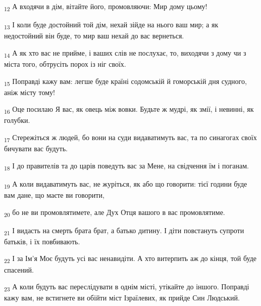 \begin{tcolorbox}
\textsubscript{12} А входячи в дім, вітайте його, промовляючи: Мир дому цьому!
\end{tcolorbox}
\begin{tcolorbox}
\textsubscript{13} І коли буде достойний той дім, нехай зійде на нього ваш мир; а як недостойний він буде, то мир ваш нехай до вас вернеться.
\end{tcolorbox}
\begin{tcolorbox}
\textsubscript{14} А як хто вас не прийме, і ваших слів не послухає, то, виходячи з дому чи з міста того, обтрусіть порох із ніг своїх.
\end{tcolorbox}
\begin{tcolorbox}
\textsubscript{15} Поправді кажу вам: легше буде країні содомській й гоморській дня судного, аніж місту тому!
\end{tcolorbox}
\begin{tcolorbox}
\textsubscript{16} Оце посилаю Я вас, як овець між вовки. Будьте ж мудрі, як змії, і невинні, як голубки.
\end{tcolorbox}
\begin{tcolorbox}
\textsubscript{17} Стережіться ж людей, бо вони на суди видаватимуть вас, та по синагогах своїх бичувати вас будуть.
\end{tcolorbox}
\begin{tcolorbox}
\textsubscript{18} І до правителів та до царів поведуть вас за Мене, на свідчення їм і поганам.
\end{tcolorbox}
\begin{tcolorbox}
\textsubscript{19} А коли видаватимуть вас, не журіться, як або що говорити: тієї години буде вам дане, що маєте ви говорити,
\end{tcolorbox}
\begin{tcolorbox}
\textsubscript{20} бо не ви промовлятимете, але Дух Отця вашого в вас промовлятиме.
\end{tcolorbox}
\begin{tcolorbox}
\textsubscript{21} І видасть на смерть брата брат, а батько дитину. І діти повстануть супроти батьків, і їх повбивають.
\end{tcolorbox}
\begin{tcolorbox}
\textsubscript{22} І за Ім'я Моє будуть усі вас ненавидіти. А хто витерпить аж до кінця, той буде спасений.
\end{tcolorbox}
\begin{tcolorbox}
\textsubscript{23} А коли будуть вас переслідувати в однім місті, утікайте до іншого. Поправді кажу вам, не встигнете ви обійти міст Ізраїлевих, як прийде Син Людський.
\end{tcolorbox}
